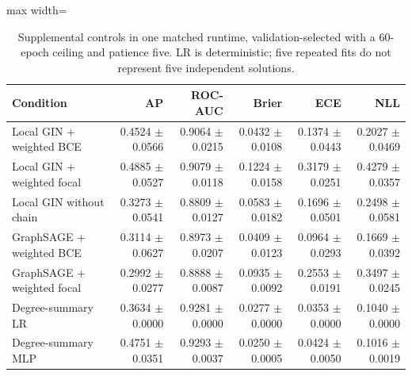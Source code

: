 \begin{table}[H]
\caption{Supplemental controls in one matched runtime, validation-selected with a 60-epoch ceiling and patience five. LR is deterministic; five repeated fits do not represent five independent solutions.}\label{tab:controls}
\centering\small
\begin{adjustbox}{max width=\linewidth}
\begin{tabular}{lrrrrr}
\toprule
Condition & AP & ROC-AUC & Brier & ECE & NLL \\
\midrule
Local GIN + weighted BCE & 0.4524 $\pm$ 0.0566 & 0.9064 $\pm$ 0.0215 & 0.0432 $\pm$ 0.0108 & 0.1374 $\pm$ 0.0443 & 0.2027 $\pm$ 0.0469 \\
Local GIN + weighted focal & 0.4885 $\pm$ 0.0527 & 0.9079 $\pm$ 0.0118 & 0.1224 $\pm$ 0.0158 & 0.3179 $\pm$ 0.0251 & 0.4279 $\pm$ 0.0357 \\
Local GIN without chain & 0.3273 $\pm$ 0.0541 & 0.8809 $\pm$ 0.0127 & 0.0583 $\pm$ 0.0182 & 0.1696 $\pm$ 0.0501 & 0.2498 $\pm$ 0.0581 \\
GraphSAGE + weighted BCE & 0.3114 $\pm$ 0.0627 & 0.8973 $\pm$ 0.0207 & 0.0409 $\pm$ 0.0123 & 0.0964 $\pm$ 0.0293 & 0.1669 $\pm$ 0.0392 \\
GraphSAGE + weighted focal & 0.2992 $\pm$ 0.0277 & 0.8888 $\pm$ 0.0087 & 0.0935 $\pm$ 0.0092 & 0.2553 $\pm$ 0.0191 & 0.3497 $\pm$ 0.0245 \\
Degree-summary LR & 0.3634 $\pm$ 0.0000 & 0.9281 $\pm$ 0.0000 & 0.0277 $\pm$ 0.0000 & 0.0353 $\pm$ 0.0000 & 0.1040 $\pm$ 0.0000 \\
Degree-summary MLP & 0.4751 $\pm$ 0.0351 & 0.9293 $\pm$ 0.0037 & 0.0250 $\pm$ 0.0005 & 0.0424 $\pm$ 0.0050 & 0.1016 $\pm$ 0.0019 \\
\bottomrule
\end{tabular}
\end{adjustbox}
\end{table}
